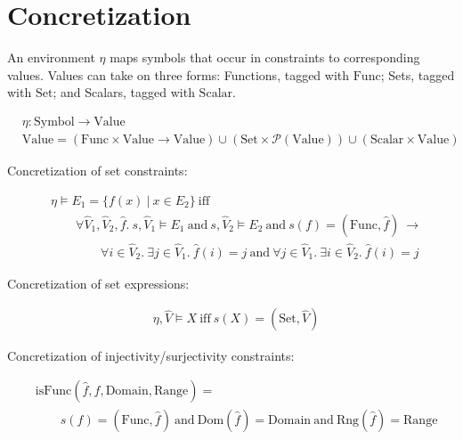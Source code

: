 \section{Concretization}

\newcommand{\env}{\eta}
\newcommand{\syms}{\mathrm{Symbol}}
\newcommand{\vals}{\mathrm{Value}}
\newcommand{\vfunc}{\mathrm{Func}}
\newcommand{\vset}{\mathrm{Set}}
\newcommand{\vscalar}{\mathrm{Scalar}}
\newcommand{\inject}{\mathbf{Injective}}
\newcommand{\surject}{\mathbf{Surjective}}

An environment $\env{}$ maps symbols that occur in constraints to corresponding values.  Values
can take on three forms: Functions, tagged with $\vfunc{}$; Sets, tagged with $\vset{}$; and
Scalars, tagged with $\vscalar{}$.

\begin{align*}
  &\env : \syms \rightarrow \vals \\
  &\vals = (\vfunc \times \vals \rightarrow \vals) \cup (\vset \times \mathcal{P}(\vals)) \cup (\vscalar \times \vals)
\end{align*}


Concretization of set constraints:

\begin{align*}
  &\env \models E_1 = \{ f(x) \ | \ x \in E_2 \} \ \mathrm{iff} \\
  &\qquad \forall \hat{V}_1, \hat{V}_2, \hat{f}.
    \  s,\hat{V}_1 \models E_1 \ \mathrm{and}
    \  s,\hat{V}_2 \models E_2 \ \mathrm{and}
    \  s(f)   = (\vfunc, \hat{f})  \ \rightarrow \\
  &\qquad\qquad \forall i \in \hat{V}_2. \ \exists j \in \hat{V}_1. \ \hat{f}(i) = j \ \mathrm{and}
    \  \forall j \in \hat{V}_1. \ \exists i \in \hat{V}_2. \ \hat{f}(i) = j
\end{align*}

Concretization of set expressions:

\begin{align*}
  &\env, \hat{V} \models X \ \mathrm{iff} \ s(X) = (\vset,\hat{V})
\end{align*}



Concretization of injectivity/surjectivity constraints:


\begin{align*}
  &\mathrm{isFunc}(\hat{f}, f, \mathrm{Domain}, \mathrm{Range}) = \\
  &\qquad s(f) = (\vfunc, \hat{f}) \ \mathrm{and}
   \ \mathrm{Dom}(\hat{f}) = \mathrm{Domain} \ \mathrm{and}
   \ \mathrm{Rng}(\hat{f}) = \mathrm{Range}
\end{align*}

